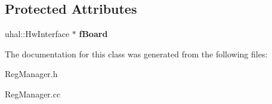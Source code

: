 \subsection*{Protected Attributes}
\begin{DoxyCompactItemize}
\item 
\hypertarget{class_ph2___hw_interface_1_1_reg_manager_a0d4908ec834a3a0b7d8139872fd0a4a0}{uhal\-::\-Hw\-Interface $\ast$ {\bfseries f\-Board}}\label{class_ph2___hw_interface_1_1_reg_manager_a0d4908ec834a3a0b7d8139872fd0a4a0}

\end{DoxyCompactItemize}


The documentation for this class was generated from the following files\-:\begin{DoxyCompactItemize}
\item 
Reg\-Manager.\-h\item 
Reg\-Manager.\-cc\end{DoxyCompactItemize}
